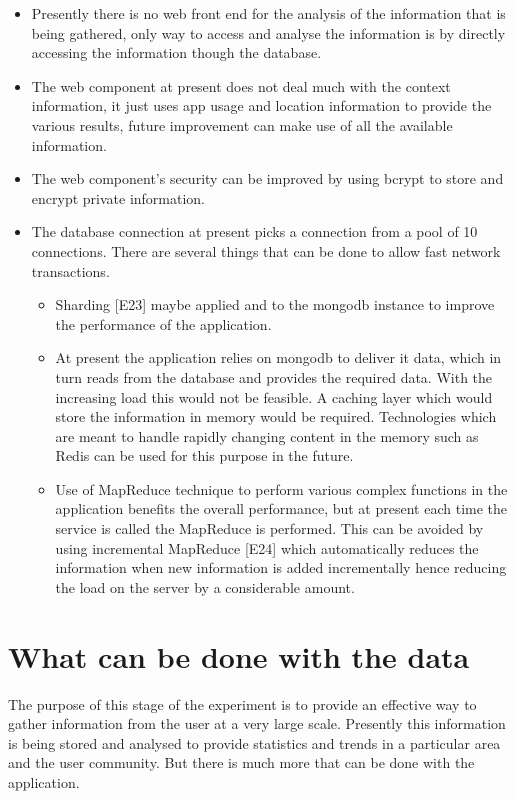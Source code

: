 \documentclass[12pt]{report}
\begin{document}
\begin{itemize}

\item Presently there is no web front end for the analysis of the information that is being gathered, only way to access and analyse the information is by directly accessing the information though the database.

\item The web component at present does not deal much with the context information, it just uses app usage and location information to provide the various results, future improvement can make use of all the available information. 

\item The web component's security can be improved by using bcrypt to store and encrypt private information.

\item The database connection at present picks a connection from a pool of 10 connections. There are several things that can be done to allow fast network transactions.
    \begin{itemize}
        \item Sharding [E23] maybe applied and to the mongodb instance to improve the performance of the application.
        \item At present the application relies on mongodb to deliver it data, which in turn reads from the database and provides the required data. With the increasing load this would not be feasible. A caching layer which would store the information in memory would be required. Technologies which are meant to handle rapidly changing content in the memory such as Redis can be used for this purpose in the future.
        
        
        \item Use of MapReduce technique to perform various complex functions in the application benefits the overall performance, but at present each time the service is called the MapReduce is performed. This can be avoided by using incremental MapReduce [E24] which automatically reduces the information when new information is added incrementally hence reducing the load on the server by a considerable amount.
    \end{itemize}

\end{itemize}



\chapter{What can be done with the data}
The purpose of this stage of the experiment is to provide an effective way to gather information from the user at a very large scale. Presently this information is being stored and analysed to provide statistics and trends in a particular area and the user community. But there is much more that can be done with the application.
\end{document}
